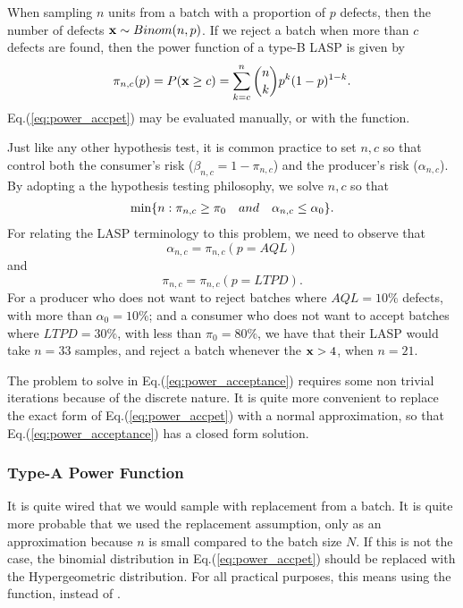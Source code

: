 When sampling $n$ units from a batch with a proportion of $p$ defects, then the number of defects $\mathbf{x} \sim Binom(n,p)$.
If we reject a batch when more than $c$ defects are found, then the power function of a type-B LASP is given by
\begin{align}
\label{eq:power_accpet}
	\pi_{n,c}(p)=P(\mathbf{x} \geq c)= \sum_{k=c}^n \binom{n}{k} p^k (1-p)^{1-k} .
\end{align}
Eq.(\ref{eq:power_accpet}) may be evaluated manually, or with the  \R function. 

Just like any other hypothesis test, it is common practice to set $n,c$ so that control both the consumer's risk ($\beta_{n,c}=1-\pi_{n,c}$) and the producer's risk ($\alpha_{n,c}$).
By adopting a the hypothesis testing philosophy, we solve $n,c$ so that 
\begin{align}
\label{eq:power_acceptance}
 \min \{ n : \pi_{n,c}\geq \pi_0 \quad and \quad \alpha_{n,c}\leq \alpha_0  \}.
\end{align}
For relating the LASP terminology to this problem, we need to observe that $$\alpha_{n,c}=\pi_{n,c}(p=AQL)$$ and $$\pi_{n,c}=\pi_{n,c}(p=LTPD).$$
For a producer who does not want to reject batches where $AQL=10\%$ defects, with more than $\alpha_0=10\%$; 
and a consumer who does not want to accept batches where $LTPD=30\%$, with less than $\pi_0=80\%$, 
we have that their LASP would take $n=33$ samples, and reject a batch whenever the $\mathbf{x}>4$, when $n=21$.
\begin{remark}
The problem to solve in Eq.(\ref{eq:power_acceptance}) requires some non trivial iterations because of the discrete nature.
It is quite more convenient to replace the exact form of Eq.(\ref{eq:power_accpet}) with a normal approximation, so that Eq.(\ref{eq:power_acceptance}) has a closed form solution. 
\end{remark}



\subsubsection{Type-A Power Function}
It is quite wired that we would sample with replacement from a batch.
It is quite more probable that we used the replacement assumption, only as an approximation because $n$ is small compared to the batch size $N$. 
If this is not the case, the binomial distribution in Eq.(\ref{eq:power_accpet}) should be replaced with the Hypergeometric distribution. 
For all practical purposes, this means using the  \R function, instead of .



